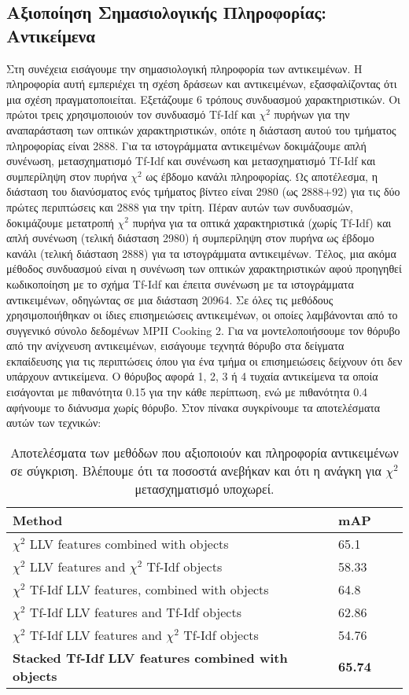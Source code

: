 \documentclass[11pt,a4paper,english,greek,twoside]{../Thesis}
\begin{document}
\subsection{Αξιοποίηση Σημασιολογικής Πληροφορίας: Αντικείμενα}
Στη συνέχεια εισάγουμε την σημασιολογική πληροφορία των αντικειμένων. Η πληροφορία αυτή εμπεριέχει τη σχέση δράσεων και αντικειμένων, εξασφαλίζοντας ότι μια σχέση πραγματοποιείται. Εξετάζουμε 6 τρόπους συνδυασμού χαρακτηριστικών. Οι πρώτοι τρεις χρησιμοποιούν τον συνδυασμό Tf-Idf και $\chi^2$ πυρήνων για την αναπαράσταση των οπτικών χαρακτηριστικών, οπότε η διάσταση αυτού του τμήματος πληροφορίας είναι 2888. Για τα ιστογράμματα αντικειμένων δοκιμάζουμε απλή συνένωση, μετασχηματισμό Tf-Idf και συνένωση και μετασχηματισμό Tf-Idf και συμπερίληψη στον πυρήνα $\chi^2$ ως έβδομο κανάλι πληροφορίας. Ως αποτέλεσμα, η διάσταση του διανύσματος ενός τμήματος βίντεο είναι 2980 (ως 2888+92) για τις δύο πρώτες περιπτώσεις και 2888 για την τρίτη. Πέραν αυτών των συνδυασμών, δοκιμάζουμε μετατροπή $\chi^2$ πυρήνα για τα οπτικά χαρακτηριστικά (χωρίς Tf-Idf) και απλή συνένωση (τελική διάσταση 2980) ή συμπερίληψη στον πυρήνα ως έβδομο κανάλι (τελική διάσταση 2888) για τα ιστογράμματα αντικειμένων. Τέλος, μια ακόμα μέθοδος συνδυασμού είναι η συνένωση των οπτικών χαρακτηριστικών αφού προηγηθεί κωδικοποίηση με το σχήμα Tf-Idf και έπειτα συνένωση με τα ιστογράμματα αντικειμένων, οδηγώντας σε μια διάσταση 20964. Σε όλες τις μεθόδους χρησιμοποιήθηκαν οι ίδιες επισημειώσεις αντικειμένων, οι οποίες λαμβάνονται από το συγγενικό σύνολο δεδομένων MPII Cooking 2. Για να μοντελοποιήσουμε τον θόρυβο από την ανίχνευση αντικειμένων, εισάγουμε τεχνητά θόρυβο στα δείγματα εκπαίδευσης για τις περιπτώσεις όπου για ένα τμήμα οι επισημειώσεις δείχνουν ότι δεν υπάρχουν αντικείμενα. Ο θόρυβος αφορά 1, 2, 3 ή 4 τυχαία αντικείμενα τα οποία εισάγονται με πιθανότητα 0.15 για την κάθε περίπτωση, ενώ με πιθανότητα 0.4 αφήνουμε το διάνυσμα χωρίς θόρυβο. Στον πίνακα συγκρίνουμε τα αποτελέσματα αυτών των τεχνικών:

\begin{table}[H]
	\centering
    \begin{tabular}{| l | l | l | l |}
    \hline
    \textbf{Method} & \textbf{mAP} \\ \hline
    $\chi^2$ LLV features combined with objects & 65.1 \\ \hline
    $\chi^2$ LLV features and $\chi^2$ Tf-Idf objects & 58.33 \\ \hline
    $\chi^2$ Tf-Idf LLV features, combined with objects & 64.8 \\ \hline
    $\chi^2$ Tf-Idf LLV features and Tf-Idf objects & 62.86 \\ \hline
    $\chi^2$ Tf-Idf LLV features and $\chi^2$ Tf-Idf objects  & 54.76 \\ \hline
    \textbf{Stacked Tf-Idf LLV features combined with objects} & \textbf{65.74} \\
    \hline
    \end{tabular}
	\label{tab:SemResults}
	\caption{Αποτελέσματα των μεθόδων που αξιοποιούν και πληροφορία αντικειμένων σε σύγκριση. Βλέπουμε ότι τα ποσοστά ανεβήκαν και ότι η ανάγκη για $\chi^2$ μετασχηματισμό υποχωρεί.}
\end{table}
\end{document}

